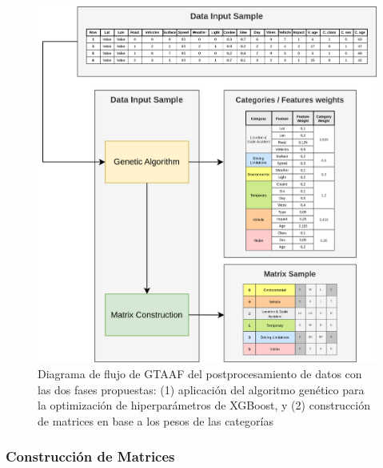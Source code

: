 \begin{figure}[H]
	\centering
	\includegraphics[width=14cm]{Figures/Postprocessing_2.png}
	\caption{Diagrama de flujo de GTAAF del postprocesamiento de datos con las dos fases propuestas: (1) aplicación del algoritmo genético para la optimización de hiperparámetros de XGBoost, y (2) construcción de matrices en base a los pesos de las categorías}
	\label{PostprocessingStage}
\end{figure}

\subsubsection{Construcción de Matrices}

